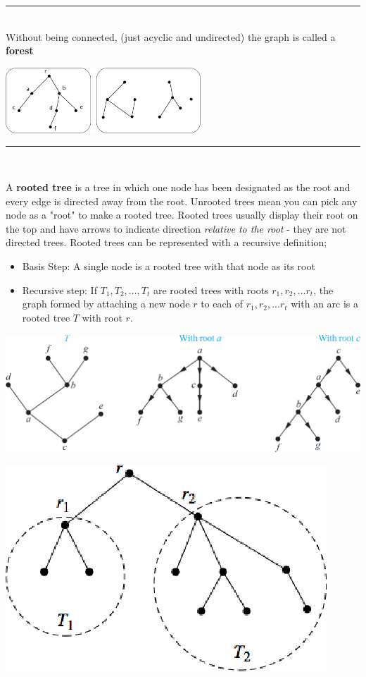 \documentclass[12pt, letterpaper]{article}
\newcommand{\horizline}[0]{\noindent\rule{\textwidth}{1pt}\\}
\begin{document}
\horizline
{\small Without being connected, (just acyclic and undirected) the graph is called a \textbf{forest}}
\begin{center}
	\includegraphics[width=0.55\textwidth]{forest.png}
\end{center}
\horizline
\begin{minipage}[t]{0.55\linewidth}
	A \textbf{rooted tree} is a tree in which one node has been designated as the root and every edge is directed away from the root. Unrooted trees mean you can pick any node as a "root" to make a rooted tree. Rooted trees usually display their root on the top and have arrows to indicate direction \emph{relative to the root} - they are not directed trees.	\bigbreak
	Rooted trees can be represented with a recursive definition;
	\begin{itemize}[leftmargin=*, label={}]
		\item Basis Step: A single node is a rooted tree with that node as its root 
		\item Recursive step: If $T_1, T_2, ..., T_t$ are rooted trees with roots $r_1, r_2,... r_t$, the graph formed by attaching a new node $r$ to each of $r_1, r_2, ... r_t$ with an arc is a rooted tree $T$ with root $r$.
	\end{itemize}
\end{minipage}
\begin{minipage}[t]{0.45\linewidth}
    \centering
    \strut\vspace*{\baselineskip}\newline\includegraphics[width=\linewidth]{rooted trees.png} \vspace*{2cm}
	\strut\vspace*{-\baselineskip}\newline\includegraphics[width=0.4\linewidth]{rooted2.png}
\end{minipage}
\end{document}
